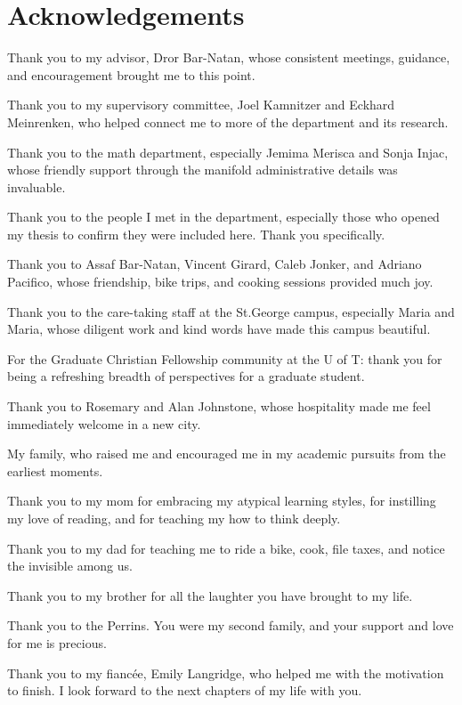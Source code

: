 
\begingroup
\let\clearpage\relax
\let\cleardoublepage\relax

\chapter*{Acknowledgements}

Thank you to my advisor, Dror Bar-Natan, whose consistent meetings, guidance,
and encouragement brought me to this point. 

Thank you to my supervisory committee, Joel Kamnitzer and Eckhard Meinrenken,
who helped connect me to more of the department and its research.

Thank you to the math department, especially Jemima Merisca and Sonja Injac,
whose friendly support through the manifold administrative details was
invaluable.

Thank you to the people I met in the department, especially those who opened
my thesis to confirm they were included here. Thank you specifically.

Thank you to Assaf Bar-Natan, Vincent Girard, Caleb Jonker, and Adriano
Pacifico, whose friendship, bike trips, and cooking sessions provided much joy.

Thank you to the care-taking staff at the St.\@ George campus, especially Maria
and Maria, whose diligent work and kind words have made this campus beautiful.

For the Graduate Christian Fellowship community at the U of T: thank you for
being a refreshing breadth of perspectives for a graduate student.

Thank you to Rosemary and Alan Johnstone, whose hospitality made me feel
immediately welcome in a new city.

My family, who raised me and encouraged me in my academic pursuits from the
earliest moments.

Thank you to my mom for embracing my atypical learning styles, for instilling
my love of reading, and for teaching my how to think deeply.

Thank you to my dad for teaching me to ride a bike, cook, file taxes, and notice
the invisible among us.

Thank you to my brother for all the laughter you have brought to my life.

Thank you to the Perrins. You were my second family, and your support and love
for me is precious.

Thank you to my fiancée, Emily Langridge, who helped me with the motivation to
finish. I look forward to the next chapters of my life with you.

\endgroup
